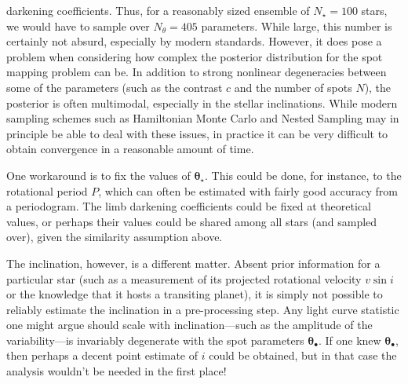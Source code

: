 \documentclass[modern]{aastex62}
\begin{document}
darkening coefficients. Thus, for a reasonably sized ensemble of $N_\star=100$
stars, we would have to sample over $N_\theta = 405$ parameters.
While large, this number is certainly not absurd, especially by modern standards.
However, it does pose
a problem when considering how complex the posterior distribution for the
spot mapping problem can be. In addition to strong nonlinear degeneracies
between some of the parameters (such as the contrast $c$ and the
number of spots $N$), the posterior is often multimodal, especially in the
stellar inclinations. While modern sampling schemes such as Hamiltonian
Monte Carlo and Nested Sampling may in principle be able to deal with these
issues, in practice it can be very difficult to obtain convergence in a
reasonable amount of time.

One workaround is to fix the values of $\pmb{\theta}_\star$. This could be done,
for instance, to the rotational period $P$, which can often be estimated with
fairly good accuracy from a periodogram. The limb darkening coefficients could
be fixed at theoretical values, or perhaps their values could be shared among
all stars (and sampled over), given the similarity assumption above.

The inclination, however, is a different matter. Absent prior information
for a particular star (such as a measurement of its projected rotational
velocity $v\sin i$ or the knowledge that it hosts a transiting planet), it
is simply not possible to reliably estimate the inclination in a
pre-processing step. Any light curve statistic one might argue should scale
with inclination---such as the amplitude of the variability---is invariably
degenerate with the spot parameters $\pmb{\theta}_\bullet$. If one knew
$\pmb{\theta}_\bullet$, then perhaps a decent point estimate of $i$ could
be obtained, but in that case the analysis wouldn't be needed in the first place!
%
\end{document}
